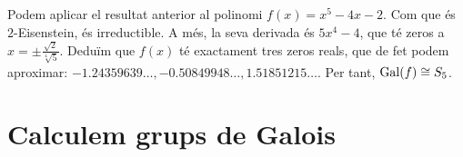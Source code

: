 \documentclass[
]{book}
\theoremstyle{definition}
\theoremstyle{definition}
\theoremstyle{definition}
\theoremstyle{definition}
\theoremstyle{remark}
\begin{document}
Podem aplicar el resultat anterior al polinomi \(f(x)=x^5-4x-2\). Com que és \(2\)-Eisenstein, és irreductible. A més, la seva derivada
és \(5x^4-4\), que té zeros a \(x=\pm\frac{\sqrt{2}}{\sqrt[4]{5}}\). Deduïm que \(f(x)\) té exactament tres zeros reals,
que de fet podem aproximar: \(-1.24359639\ldots,-0.50849948\ldots,1.51851215\ldots\). Per tant, \(\operatorname{Gal}(f)\cong S_5\).

\hypertarget{calculem-grups-de-galois}{%
\chapter{Calculem grups de Galois}\label{calculem-grups-de-galois}}

\nocite{*}

  
\end{document}
